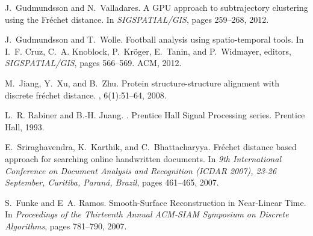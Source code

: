 \documentclass[a4paper,11pt]{article}
\begin{document}
\begin{thebibliography}{50}
J.~Gudmundsson and N.~Valladares.
\newblock A {GPU} approach to subtrajectory clustering using the {F}r\'{e}chet
  distance.
\newblock In {\em SIGSPATIAL/GIS}, pages 259--268, 2012.

J.~Gudmundsson and T.~Wolle.
\newblock Football analysis using spatio-temporal tools.
\newblock In I.~F. Cruz, C.~A. Knoblock, P.~Kr{\"o}ger, E.~Tanin, and
  P.~Widmayer, editors, {\em SIGSPATIAL/GIS}, pages 566--569. ACM, 2012.

M.~Jiang, Y.~Xu, and B.~Zhu.
\newblock Protein structure-structure alignment with discrete fr{\'{e}}chet
  distance.
, 6(1):51--64, 2008.

L.~R. Rabiner and B.-H. Juang.
.
\newblock Prentice Hall {S}ignal {P}rocessing series. Prentice Hall, 1993.

E.~Sriraghavendra, K.~Karthik, and C.~Bhattacharyya.
\newblock Fr{\'{e}}chet distance based approach for searching online
  handwritten documents.
\newblock In {\em 9th International Conference on Document Analysis and
  Recognition {(ICDAR} 2007), 23-26 September, Curitiba, Paran{\'{a}}, Brazil},
  pages 461--465, 2007.
  
S.~Funke and E~A. Ramos.
\newblock Smooth-Surface Reconstruction in Near-Linear Time.
\newblock In {\em Proceedings of the Thirteenth Annual {ACM}-{SIAM} Symposium on Discrete Algorithms},
 pages 781--790, 2007.
               

\end{thebibliography}
\end{document}
